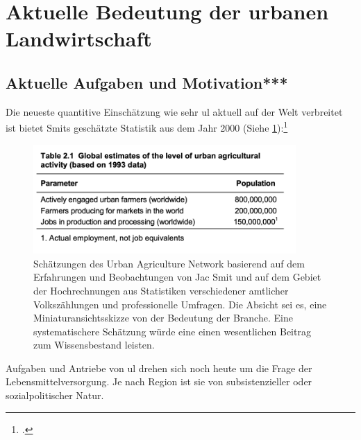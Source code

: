 \documentclass{scrartcl}
\begin{document}
\section{Aktuelle Bedeutung der urbanen Landwirtschaft}
\subsection{Aktuelle Aufgaben und Motivation***}

Die neueste quantitive Einschätzung wie sehr \acs{ul} aktuell auf der Welt verbreitet ist bietet Smits geschätzte Statistik aus dem Jahr 2000 (Siehe \ref{fig:ulstatistics}):\footcite[Vgl.][S.1]{Smit2001UrbanToday}
\begin{figure}[htbp]
    \centering
    \includegraphics[width=10cm]{image_folder/800000ul.png}
  \caption{Schätzungen des Urban Agriculture Network basierend auf dem Erfahrungen und Beobachtungen von Jac Smit und auf dem Gebiet der Hochrechnungen aus Statistiken verschiedener amtlicher Volkszählungen und professionelle Umfragen. Die Absicht sei es, eine Miniaturansichtsskizze von der Bedeutung der Branche. Eine systematischere Schätzung würde eine einen wesentlichen Beitrag zum Wissensbestand leisten.}
  \label{fig:ulstatistics}
\end{figure} 

Aufgaben und Antriebe von \acs{ul} drehen sich noch heute um die Frage der Lebensmittelversorgung. Je nach Region ist sie von subsistenzieller oder sozialpolitischer Natur. 
\end{document}
